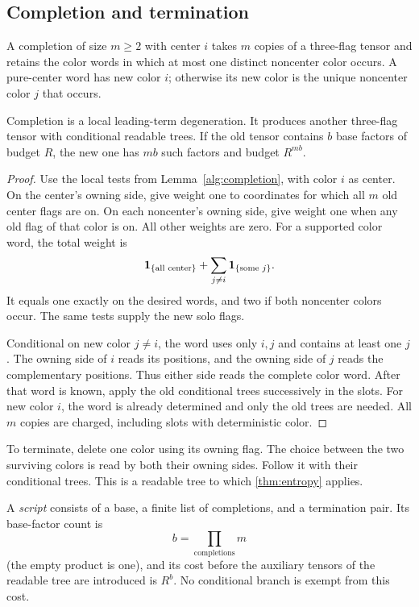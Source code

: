 \subsection{Completion and termination}

\begin{definition}\label{def:completion}
A completion of size \(m\ge2\) with center \(i\) takes \(m\) copies
of a three-flag tensor and retains the color words in which at most
one distinct noncenter color occurs.
A pure-center word has new color \(i\); otherwise its new color is
the unique noncenter color \(j\) that occurs.
\end{definition}

\begin{lemma}\label{lem:completion}
Completion is a local leading-term degeneration.
It produces another three-flag tensor with conditional readable trees.
If the old tensor contains \(b\) base factors of budget \(R\), the new
one has \(mb\) such factors and budget \(R^{mb}\).
\end{lemma}

\begin{proof}
Use the local tests from Lemma~\ref{alg:completion}, with color \(i\)
as center.  On the center's owning side, give weight one to coordinates for which
all \(m\) old center flags are on.
On each noncenter's owning side, give weight one when any old flag of
that color is on.
All other weights are zero.
For a supported color word, the total weight is
\[
 \mathbf 1_{\{\text{all center}\}}+
 \sum_{j\ne i}\mathbf 1_{\{\text{some }j\}}.
\]
It equals one exactly on the desired words, and two if both noncenter
colors occur.
The same tests supply the new solo flags.

Conditional on new color \(j\ne i\), the word uses only \(i,j\)
and contains at least one \(j\).
The owning side of \(i\) reads its positions, and the owning side of
\(j\) reads the complementary positions.
Thus either side reads the complete color word.
After that word is known, apply the old conditional trees successively
in the slots.
For new color \(i\), the word is already determined and only the old
trees are needed.
All \(m\) copies are charged, including slots with deterministic color.
\end{proof}

To terminate, delete one color using its owning flag.
The choice between the two surviving colors is read by both their
owning sides.  Follow it with their conditional trees.
This is a readable tree to which \cref{thm:entropy} applies.

A \emph{script} consists of a base, a finite list of completions, and
a termination pair.
Its base-factor count is
\[
 b=\prod_{\text{completions}}m
\]
(the empty product is one), and its cost before the auxiliary tensors
of the readable tree are introduced is \(R^b\).
No conditional branch is exempt from this cost.

